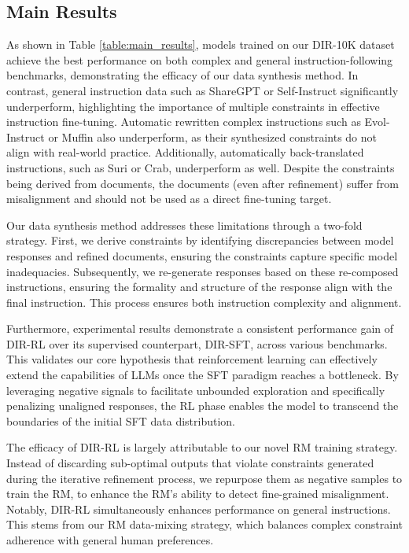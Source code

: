 \subsection{Main Results}
As shown in Table \ref{table:main_results}, models trained on our DIR-10K dataset achieve the best performance on both complex and general instruction-following benchmarks, demonstrating the efficacy of our data synthesis method. In contrast, general instruction data such as ShareGPT or Self-Instruct significantly underperform, highlighting the importance of multiple constraints in effective instruction fine-tuning. Automatic rewritten complex instructions such as Evol-Instruct or Muffin also underperform, as their synthesized constraints do not align with real-world practice. Additionally, automatically back-translated instructions, such as Suri or Crab, underperform as well. Despite the constraints being derived from documents, the documents (even after refinement) suffer from misalignment and should not be used as a direct fine-tuning target.

Our data synthesis method addresses these limitations through a two-fold strategy. First, we derive constraints by identifying discrepancies between model responses and refined documents, ensuring the constraints capture specific model inadequacies. Subsequently, we re-generate responses based on these re-composed instructions, ensuring the formality and structure of the response align with the final instruction. This process ensures both instruction complexity and alignment.

Furthermore, experimental results demonstrate a consistent performance gain of DIR-RL over its supervised counterpart, DIR-SFT, across various benchmarks. This validates our core hypothesis that reinforcement learning can effectively extend the capabilities of LLMs once the SFT paradigm reaches a bottleneck. By leveraging negative signals to facilitate unbounded exploration and specifically penalizing unaligned responses, the RL phase enables the model to transcend the boundaries of the initial SFT data distribution.

The efficacy of DIR-RL is largely attributable to our novel RM training strategy. Instead of discarding sub-optimal outputs that violate constraints generated during the iterative refinement process, we repurpose them as negative samples to train the RM, to enhance the RM’s ability to detect fine-grained misalignment. Notably, DIR-RL simultaneously enhances performance on general instructions. This stems from our RM data-mixing strategy, which balances complex constraint adherence with general human preferences.

